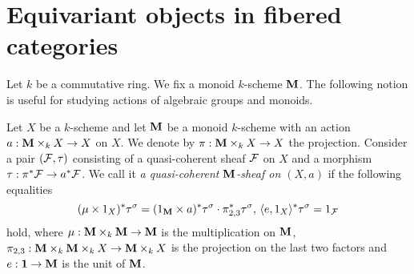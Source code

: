 \section{Equivariant objects in fibered categories}
\noindent
Let $k$ be a commutative ring. We fix a monoid $k$-scheme $\mathbf{M}$. The following notion is useful for studying actions of algebraic groups and monoids.

\begin{definition}
Let $X$ be a $k$-scheme and let $\mathbf{M}$ be a monoid $k$-scheme with an action $a:\mathbf{M}\times_kX\rightarrow X$ on $X$. We denote by $\pi:\mathbf{M}\times_kX\rightarrow X$ the projection. Consider a pair $({\mathcal F},\tau)$ consisting of a quasi-coherent sheaf ${\mathcal F}$ on $X$ and a morphism $\tau:\pi^*{\mathcal F} \rightarrow a^* {\mathcal F}$. We call it \textit{a quasi-coherent $\mathbf{M}$-sheaf on $(X,a)$} if the following equalities
$$(\mu \times 1_X)^*\tau^{\sigma} = (1_{\mathbf{M}} \times  a)^*\tau^{\sigma} \cdot \pi_{2,3}^*\tau^{\sigma},\,\langle e, 1_{X} \rangle^*\tau^{\sigma} = 1_{{\mathcal F}}$$
hold, where $\mu: \mathbf{M} \times_k \mathbf{M} \rightarrow \mathbf{M}$ is the multiplication on $\mathbf{M}$, $\pi_{2,3}:\mathbf{M}\times_k  \mathbf{M} \times_k  X \rightarrow \mathbf{M} \times_k X$ is the projection on the last two factors and $e:\mathbf{1}\rightarrow \mathbf{M}$ is the unit of $\mathbf{M}$.
\end{definition}

